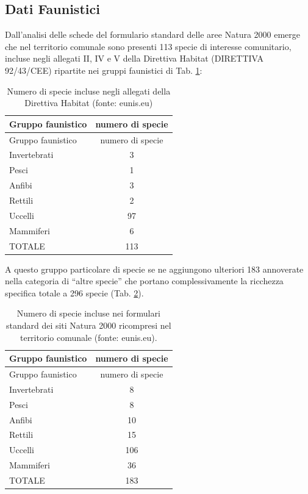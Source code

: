 \documentclass[
]{book}
\begin{document}
\subsection{Dati Faunistici}\label{dati-faunistici}

Dall'analisi delle schede del formulario standard delle aree Natura 2000 emerge che nel territorio comunale sono presenti 113 specie di interesse comunitario, incluse negli allegati II, IV e V della Direttiva Habitat (DIRETTIVA 92/43/CEE) ripartite nei gruppi faunistici di Tab.
\ref{tab:DH}:

\begin{longtable}[]{@{}lc@{}}
\caption{\label{tab:DH} Numero di specie incluse negli allegati della Direttiva Habitat (fonte: eunis.eu)}\tabularnewline
\toprule\noalign{}
Gruppo faunistico & numero di specie \\
\midrule\noalign{}
\endfirsthead
\toprule\noalign{}
Gruppo faunistico & numero di specie \\
\midrule\noalign{}
\endhead
\bottomrule\noalign{}
\endlastfoot
Invertebrati & 3 \\
Pesci & 1 \\
Anfibi & 3 \\
Rettili & 2 \\
Uccelli & 97 \\
Mammiferi & 6 \\
TOTALE & 113 \\
\end{longtable}

A questo gruppo particolare di specie se ne aggiungono ulteriori 183 annoverate nella categoria di ``altre specie'' che portano complessivamente la ricchezza specifica totale a 296 specie (Tab. \ref{tab:DHaltre}).

\begin{longtable}[]{@{}lc@{}}
\caption{\label{tab:DHaltre} Numero di specie incluse nei formulari standard dei siti Natura 2000 ricompresi nel territorio comunale (fonte: eunis.eu).}\tabularnewline
\toprule\noalign{}
Gruppo faunistico & numero di specie \\
\midrule\noalign{}
\endfirsthead
\toprule\noalign{}
Gruppo faunistico & numero di specie \\
\midrule\noalign{}
\endhead
\bottomrule\noalign{}
\endlastfoot
Invertebrati & 8 \\
Pesci & 8 \\
Anfibi & 10 \\
Rettili & 15 \\
Uccelli & 106 \\
Mammiferi & 36 \\
TOTALE & 183 \\
\end{longtable}
\end{document}
